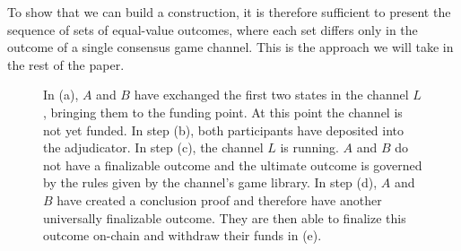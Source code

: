 To show that we can build a construction, it is therefore sufficient to present the sequence of sets of equal-value outcomes, where each set differs only in the outcome of a single consensus game channel. This is the approach we will take in the rest of the paper.

\begin{figure}[h]\centering
  \makebox[\textwidth][c]{}
  \caption{
    In (a), $A$ and $B$ have exchanged the first two states in the channel $L$, bringing them to the funding point. At this point the channel is not yet funded.
    In step (b), both participants have deposited into the adjudicator.
    In step (c), the channel $L$ is running.
    $A$ and $B$ do not have a finalizable outcome and the ultimate outcome is governed by the rules given by the channel's game library.
    In step (d), $A$ and $B$ have created a conclusion proof and therefore have another universally finalizable outcome.
    They are then able to finalize this outcome on-chain and withdraw their funds in (e).
  }
\end{figure}
